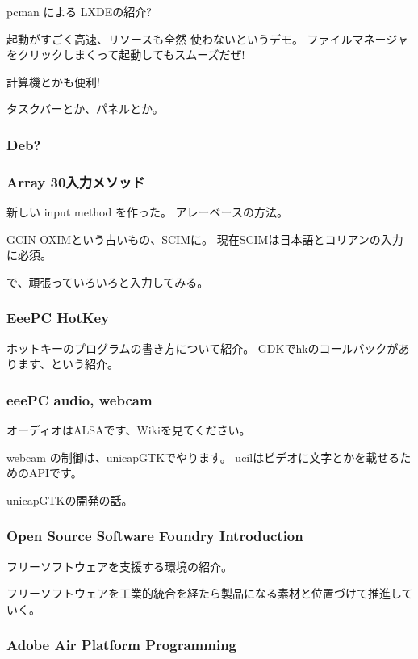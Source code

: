 \documentclass[mingoth,a4paper]{jsarticle}
\begin{document}
pcman による LXDEの紹介?


起動がすごく高速、リソースも全然
使わないというデモ。
ファイルマネージャをクリックしまくって起動してもスムーズだぜ!

計算機とかも便利!

タスクバーとか、パネルとか。

\subsubsection{Deb?}

\subsubsection{Array 30入力メソッド}

新しい input method を作った。
アレーベースの方法。

GCIN OXIMという古いもの、SCIMに。
現在SCIMは日本語とコリアンの入力に必須。

で、頑張っていろいろと入力してみる。

\subsubsection{EeePC HotKey}

ホットキーのプログラムの書き方について紹介。
GDKでhkのコールバックがあります、という紹介。

\subsubsection{eeePC audio, webcam}

オーディオはALSAです、Wikiを見てください。

webcam の制御は、unicapGTKでやります。
ucilはビデオに文字とかを載せるためのAPIです。

unicapGTKの開発の話。

\subsubsection{Open Source Software Foundry Introduction}

フリーソフトウェアを支援する環境の紹介。

フリーソフトウェアを工業的統合を経たら製品になる素材と位置づけて推進して
いく。

\subsubsection{Adobe Air Platform Programming}
\end{document}
